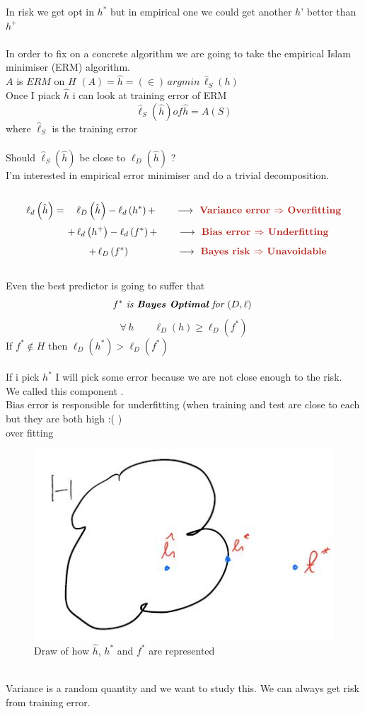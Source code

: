 \documentclass[../main.tex]{subfiles}
\begin{document}
In risk we get opt in $h^*$ but in empirical one we could get another $h’$ better than $h^+$
\\\\
In order to fix on a concrete algorithm we are going to take the empirical Islam
minimiser (ERM) algorithm.
\\
$A$ is $ERM$ on $H$ \qquad $\left(A\right) = \hat{h} = (\in) \, argmin \, \hat{\ell}_S\left(h\right)
$
\\
Once I piack $\hat{h}$ i can look at training error of ERM
\\
$$ \hat{\ell}_S\left(\hat{h}\right) of \hat{h} = A(S)$$
where $\hat{\ell}_S$ is the training error
\\\\
Should $\hat{\ell}_S\left(\hat{h}\right)$ be close to $\ell_D\left(\hat{h}\right)$ ?
\\
I’m interested in empirical error minimiser and do a trivial decomposition.
\\\\
$$
\ell_d\left(\hat{h}\right) = \quad \ell_D\left(\hat{h}\right) - \ell_d\left(h^*\right) + \qquad \longrightarrow \red{\textbf{ Variance error $\Rightarrow$ Overfitting}}
$$
$$
\qquad \quad +\,  \ell_d\left(h^+\right) - \ell_d\left(f^*\right) + \qquad \longrightarrow \red{\textbf{ Bias error $\Rightarrow$ Underfitting}}
$$
$$ \qquad \qquad \quad 
+ \, \ell_D\left(f^*\right)\qquad \qquad \quad  \longrightarrow \red{\textbf{ Bayes risk $\Rightarrow$ Unavoidable}} 
$$\\
Even the best predictor is going to suffer that\\
$$ f^* \textit{ is \textbf{Bayes Optimal} for $(D,\ell)$ }
$$
$$\forall \, h \qquad \ell_D\left(h\right) \geq \ell_D\left(f^*\right)
$$
If $f^* \not\in H$ then $\ell_D\left(h^*\right) > \ell_D (f^*) $
\\\\
If i pick $h^*$ I will pick some error because we are not close enough to the risk.\\
We called this component .\\
Bias error is responsible for underfitting (when training and test are close
to each but they are both high :( )\\
 over fitting
\\
\begin{figure}[h]
    \centering
    \includegraphics[width=0.5\linewidth]{../img/lez7-img6.JPG}
    \caption{Draw of how $\hat{h}$, $h^*$ and $f^*$ are represented}
\end{figure}\\
Variance is a random quantity and we want to study this.
We can always get risk from training error.
\\\\
\end{document}
